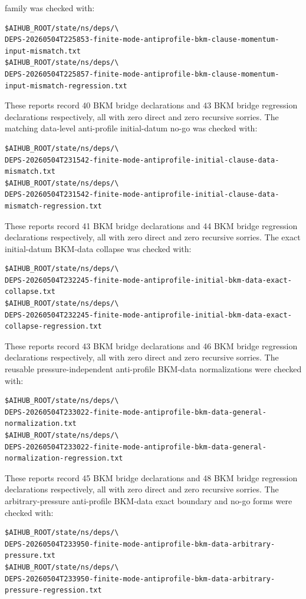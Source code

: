 \documentclass[11pt]{article}
\begin{document}
family was checked with:
\begin{verbatim}
$AIHUB_ROOT/state/ns/deps/\
DEPS-20260504T225853-finite-mode-antiprofile-bkm-clause-momentum-input-mismatch.txt
$AIHUB_ROOT/state/ns/deps/\
DEPS-20260504T225857-finite-mode-antiprofile-bkm-clause-momentum-input-mismatch-regression.txt
\end{verbatim}
These reports record 40 BKM bridge declarations and 43 BKM bridge regression
declarations respectively, all with zero direct and zero recursive sorries.
The matching data-level anti-profile initial-datum no-go was checked with:
\begin{verbatim}
$AIHUB_ROOT/state/ns/deps/\
DEPS-20260504T231542-finite-mode-antiprofile-initial-clause-data-mismatch.txt
$AIHUB_ROOT/state/ns/deps/\
DEPS-20260504T231542-finite-mode-antiprofile-initial-clause-data-mismatch-regression.txt
\end{verbatim}
These reports record 41 BKM bridge declarations and 44 BKM bridge regression
declarations respectively, all with zero direct and zero recursive sorries.
The exact initial-datum BKM-data collapse was checked with:
\begin{verbatim}
$AIHUB_ROOT/state/ns/deps/\
DEPS-20260504T232245-finite-mode-antiprofile-initial-bkm-data-exact-collapse.txt
$AIHUB_ROOT/state/ns/deps/\
DEPS-20260504T232245-finite-mode-antiprofile-initial-bkm-data-exact-collapse-regression.txt
\end{verbatim}
These reports record 43 BKM bridge declarations and 46 BKM bridge regression
declarations respectively, all with zero direct and zero recursive sorries.
The reusable pressure-independent anti-profile BKM-data normalizations were
checked with:
\begin{verbatim}
$AIHUB_ROOT/state/ns/deps/\
DEPS-20260504T233022-finite-mode-antiprofile-bkm-data-general-normalization.txt
$AIHUB_ROOT/state/ns/deps/\
DEPS-20260504T233022-finite-mode-antiprofile-bkm-data-general-normalization-regression.txt
\end{verbatim}
These reports record 45 BKM bridge declarations and 48 BKM bridge regression
declarations respectively, all with zero direct and zero recursive sorries.
The arbitrary-pressure anti-profile BKM-data exact boundary and no-go forms
were checked with:
\begin{verbatim}
$AIHUB_ROOT/state/ns/deps/\
DEPS-20260504T233950-finite-mode-antiprofile-bkm-data-arbitrary-pressure.txt
$AIHUB_ROOT/state/ns/deps/\
DEPS-20260504T233950-finite-mode-antiprofile-bkm-data-arbitrary-pressure-regression.txt
\end{verbatim}
\end{document}

